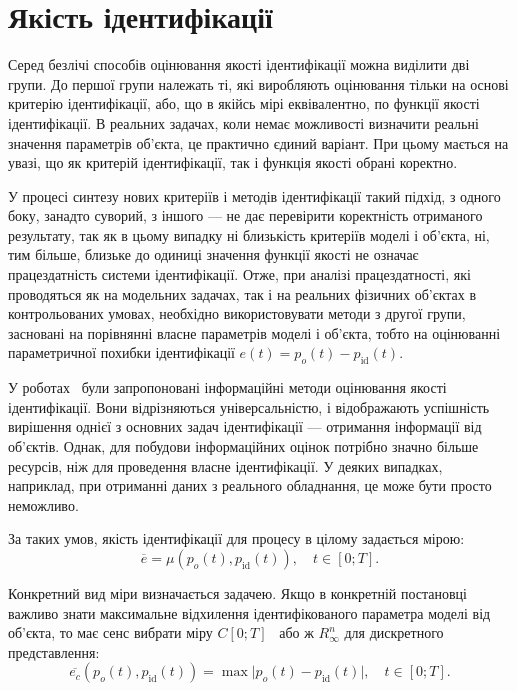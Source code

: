 \section{Якість ідентифікації}%

Серед безлічі способів оцінювання якості ідентифікації можна
виділити дві групи. До першої групи належать ті, які виробляють
оцінювання тільки на основі критерію ідентифікації, або, що в
якійсь мірі еквівалентно, по функції якості ідентифікації. В
реальних задачах, коли немає можливості визначити реальні
значення параметрів об'єкта, це практично єдиний варіант. При
цьому мається на увазі, що як критерій ідентифікації, так і
функція якості обрані коректно.

У процесі синтезу нових критеріїв і методів ідентифікації
такий підхід, з одного боку, занадто суворий, з іншого --- не
дає перевірити коректність отриманого результату, так як в
цьому випадку ні близькість критеріїв моделі і об'єкта, ні, тим
більше, близьке до одиниці значення функції якості не означає
працездатність системи ідентифікації. Отже, при аналізі
працездатності, які проводяться як на модельних задачах,
так і на реальних фізичних об'єктах в контрольованих умовах,
необхідно використовувати методи з другої групи, засновані
на порівнянні власне параметрів моделі і об'єкта, тобто на
оцінюванні параметричної похибки ідентифікації
$e(t) = p_o(t) - p_\mathrm{id}(t)$.

У роботах~\cite{info_cipkin, straton_inf, atu_phd_thesis, karabut} були запропоновані
інформаційні методи оцінювання якості ідентифікації. Вони
відрізняються універсальністю, і відображають успішність
вирішення однієї з основних задач ідентифікації --- отримання
інформації від об'єктів. Однак, для побудови інформаційних оцінок
потрібно значно більше ресурсів, ніж для проведення власне
ідентифікації. У деяких випадках, наприклад, при отриманні
даних з реального обладнання, це може бути просто неможливо.



За таких умов,
якість ідентифікації для процесу в цілому задається мірою:
%
\[
  \overline{e} = \mu( p_o(t), p_\mathrm{id}(t) ),
  \quad
  t \in [0;T].
\]

Конкретний вид міри визначається задачею. Якщо в конкретній постановці
важливо знати максимальне відхилення ідентифікованого параметра моделі від
об'єкта, то має сенс вибрати міру $C[0; T]$~\cite{kolmogorov_fun_ana} або ж $ R_{\infty}^n$ для
дискретного представлення:
%
\begin{equation}
  \overline{e_c}(p_o(t),p_\mathrm{id}(t))
  =
  \max \big| p_o(t)-p_\mathrm{id}(t) \big|,
  \quad
  t \in [0;T].
  \label{atu:eq:e_c}
\end{equation}

